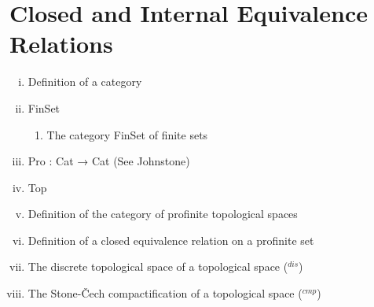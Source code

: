 \documentclass[13pt]{amsart}
\begin{document}
\section{}



\section{Closed and Internal Equivalence Relations}

\begin{enumerate}[(i)]
\item Definition of a category
\item FinSet
\begin{enumerate}
\item The category FinSet of finite sets 
\end{enumerate}
\item Pro : Cat → Cat (See Johnstone)
\item Top \iffalse
\item Definition of compact
\item Definition of Hausdorff
\item Definition of a cofiltered diagram
\item Definition of a cofiltered limit on objects
\item Definition the category Pro C for a category C
\item The product of profinite sets is profinite and satisfies the universal property of product in profinite sets.
\item Definition of a $\texttt{Pro FinSet}$
\item Definition of a $\texttt{CH}$ the category of compact hausdorff topological spaces, a fully faithful subcategory of topological spaces  \fi
\item Definition of the category of profinite topological spaces
\item Definition of a closed equivalence relation on a profinite set
\item The discrete topological space of a topological space (${}^{dis}$)
\item The Stone-Čech compactification of a topological space (${}^{cmp}$)
\end{enumerate}

    
\end{document}

